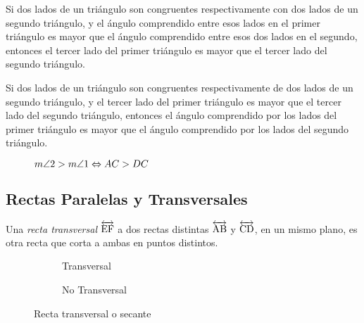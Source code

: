 \begin{theorem}
    Si dos lados de un triángulo son congruentes respectivamente con dos lados de un segundo triángulo, y el ángulo comprendido entre esos lados en el primer triángulo es mayor que el ángulo comprendido entre esos dos lados en el segundo, entonces el tercer lado del primer triángulo es mayor que el tercer lado del segundo triángulo.
\end{theorem}

\begin{theorem}
    Si dos lados de un triángulo son congruentes respectivamente de dos lados de un segundo triángulo, y el tercer lado del primer triángulo es mayor que el tercer lado del segundo triángulo, entonces el ángulo comprendido por los lados del primer triángulo es mayor que el ángulo comprendido por los lados del segundo triángulo.

    \begin{figure}[!h]
        \centering
        
        \caption{$m\angle{2} > m\angle{1} \Leftrightarrow AC > DC$}
        \label{fig:theorem5}
    \end{figure}
    
\end{theorem}

\clearpage

\subsection{Rectas Paralelas y Transversales}

\begin{definition}
    Una \textit{recta transversal} $\overleftrightarrow{\rm EF}$ a dos rectas distintas $\overleftrightarrow{\rm AB}$ y $\overleftrightarrow{\rm CD}$, en un mismo plano, es otra recta que corta a ambas en puntos distintos.


    \begin{figure}[h!]

        \centering

        \begin{subfigure}[b]{.5\textwidth}
            \centering
            
            \label{fig:transversal}
            \caption{Transversal}
        \end{subfigure}%
        \begin{subfigure}[b]{.5\textwidth}
            \centering
            
            \label{fig:not-transversal}
            \caption{No Transversal}
        \end{subfigure}

        \centering
        \caption{Recta transversal o secante}
        \label{fig:transversal-line}
        
    \end{figure}        
    
\end{definition}

